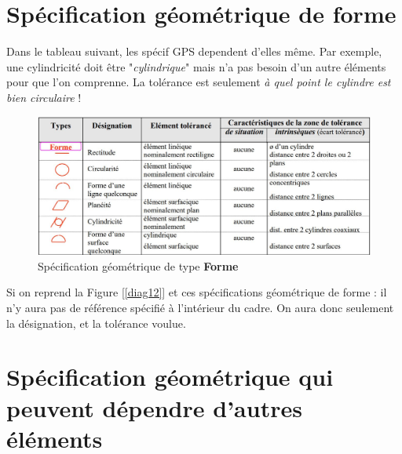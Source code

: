\documentclass[
	11pt, %
	fleqn, %
	a4paper, %
]{LegrandOrangeBook}
\begin{document}
\section{Spécification géométrique de forme}

Dans le tableau suivant, les spécif GPS dependent d'elles même. Par exemple, une cylindricité doit être "\textit{cylindrique}" mais n'a pas besoin d'un autre éléments pour que l'on comprenne. La tolérance est seulement \textit{à quel point le cylindre est bien circulaire} !

\begin{figure}[H] %
	\centering %
	\includegraphics[width=1.15\textwidth]{Images/formes.JPG} 
	\caption{Spécification géométrique de type \textbf{Forme}}
	\label{forme} %
\end{figure}


Si on reprend la Figure [\ref{diag12}] et ces spécifications géométrique de forme : il n'y aura pas de référence spécifié à l'intérieur du cadre. On aura donc seulement la désignation, et la tolérance voulue.

\section{Spécification géométrique qui peuvent dépendre d'autres éléments}
\end{document}
